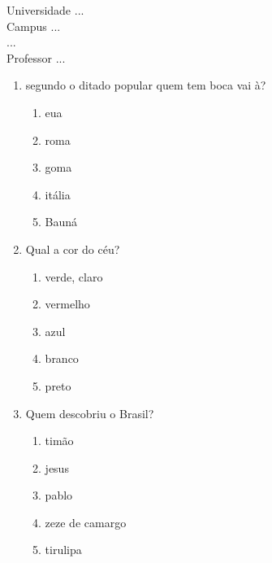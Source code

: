 \documentclass[10pt,a4paper,twocolumn]{report}
\begin{document}
\begin{flushleft}
Universidade ...\\
Campus ...\\
...\\
Professor ...\\
\end{flushleft}




 \begin{enumerate} 
    \item  segundo o ditado popular quem tem boca vai à?





    \begin{enumerate}
    \item  eua

\item  roma

\item  goma

\item  itália

\item  Bauná


    \end{enumerate} 
    \item  Qual a cor do céu?





    \begin{enumerate}
    \item  verde, claro

\item  vermelho

\item  azul

\item  branco

\item  preto


    \end{enumerate} 
    \item  Quem descobriu o Brasil?





    \begin{enumerate}
    \item  timão

\item  jesus

\item  pablo

\item  zeze de camargo

\item  tirulipa


    \end{enumerate}\end{enumerate} 
\end{document}
